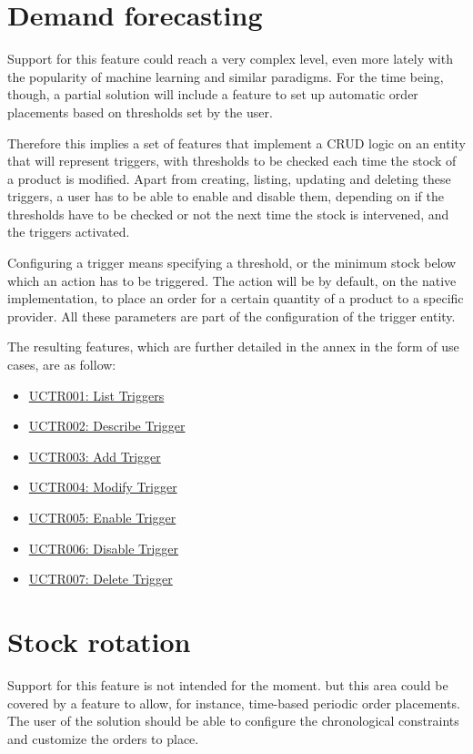 \section{Demand forecasting}
Support for this feature could reach a very complex level, even more lately with the popularity of machine learning and similar paradigms. For the time being, though, a partial solution will include a feature to set up automatic order placements based on thresholds set by the user.

Therefore this implies a set of features that implement a CRUD logic on an entity that will represent triggers, with thresholds to be checked each time the stock of a product is modified. Apart from creating, listing, updating and deleting these triggers, a user has to be able to enable and disable them, depending on if the thresholds have to be checked or not the next time the stock is intervened, and the triggers activated.

Configuring a trigger means specifying a threshold, or the minimum stock below which an action has to be triggered. The action will be by default, on the native implementation, to place an order for a certain quantity of a product to a specific provider. All these parameters are part of the configuration of the trigger entity.

The resulting features, which are further detailed in the annex in the form of use cases, are as follow:
\hfill\break
\begin{itemize}
\item \hyperref[UCTR001]{UCTR001: List Triggers}
\item \hyperref[UCTR002]{UCTR002: Describe Trigger}
\item \hyperref[UCTR003]{UCTR003: Add Trigger}
\item \hyperref[UCTR004]{UCTR004: Modify Trigger}
\item \hyperref[UCTR005]{UCTR005: Enable Trigger}
\item \hyperref[UCTR006]{UCTR006: Disable Trigger}
\item \hyperref[UCTR007]{UCTR007: Delete Trigger}
\end{itemize}
\hfill\break
\section{Stock rotation}
Support for this feature is not intended for the moment. but this area could be covered by a feature to allow, for instance, time-based periodic order placements. The user of the solution should be able to configure the chronological constraints and customize the orders to place.

